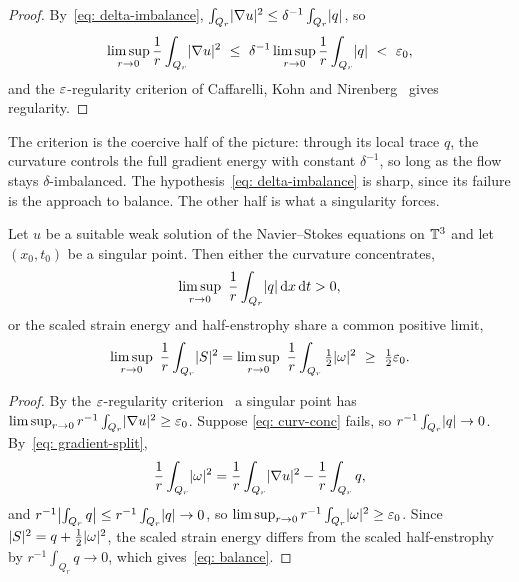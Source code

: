 \begin{proof}
By~\eqref{eq: delta-imbalance}, $\int_{Q_r}\lvert \nabla u \rvert^2 \le
\delta^{-1}\int_{Q_r}\lvert q \rvert$, so
\[
  \limsup_{r\to0}\frac{1}{r}\int_{Q_r}\lvert \nabla u \rvert^2
  \ \le\ \delta^{-1}\limsup_{r\to0}\frac{1}{r}\int_{Q_r}\lvert q \rvert
  \ <\ \varepsilon_0,
\]
and the $\varepsilon$-regularity criterion of Caffarelli, Kohn and
Nirenberg~\cite{caffarelli-1982-par-reg-sui} gives regularity.
\end{proof}

The criterion is the coercive half of the picture: through its local trace $q$,
the curvature controls the full gradient energy with constant $\delta^{-1}$, so
long as the flow stays $\delta$-imbalanced. The hypothesis~\eqref{eq: delta-imbalance}
is sharp, since its failure is the approach to balance. The other half is what a
singularity forces.

\begin{theorem}\label{thm: dichotomy}
Let $u$ be a suitable weak solution of
the Navier--Stokes equations on $\mathbb{T}^3$ and let $(x_0,t_0)$ be a singular point. Then
either the curvature concentrates,
\begin{equation}\label{eq: curv-conc}
  \limsup_{r\to0}\ \frac{1}{r}\int_{Q_r}\lvert q \rvert\,\mathrm{d} x\,\mathrm{d} t > 0,
\end{equation}
or the scaled strain energy and half-enstrophy share a common positive limit,
\begin{equation}\label{eq: balance}
  \limsup_{r\to0}\ \frac{1}{r}\int_{Q_r}\abs{S}^2
  = \limsup_{r\to0}\ \frac{1}{r}\int_{Q_r}\tfrac12\abs{\omega}^2 \ \ge\ \tfrac12\eps_0.
\end{equation}
\end{theorem}

\begin{proof}
By the $\varepsilon$-regularity criterion~\cite{caffarelli-1982-par-reg-sui} a singular
point has $\limsup_{r\to0} r^{-1}\int_{Q_r}\lvert \nabla u \rvert^2 \ge \varepsilon_0$. Suppose
\eqref{eq: curv-conc} fails, so $r^{-1}\int_{Q_r}\lvert q \rvert \to 0$.
By~\eqref{eq: gradient-split},
\[
  \frac{1}{r}\int_{Q_r}\lvert \omega \rvert^2
  = \frac{1}{r}\int_{Q_r}\lvert \nabla u \rvert^2 - \frac{1}{r}\int_{Q_r} q,
\]
and $r^{-1}\bigl|\int_{Q_r} q\bigr| \le r^{-1}\int_{Q_r}\lvert q \rvert \to 0$, so
$\limsup_{r\to0} r^{-1}\int_{Q_r}\lvert \omega \rvert^2 \ge \varepsilon_0$. Since
$\lvert S \rvert^2 = q + \tfrac12\lvert \omega \rvert^2$, the scaled strain energy differs from
the scaled half-enstrophy by $r^{-1}\int_{Q_r} q \to 0$, which
gives~\eqref{eq: balance}.
\end{proof}

